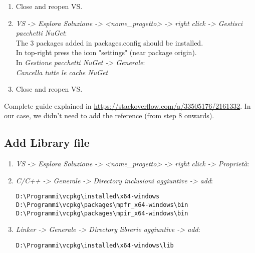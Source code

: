 \documentclass[11pt, english, openany]{report}
\begin{document}
\begin{appendices}
\begin{enumerate}
\begin{lstlisting}
.\..\packages\NuGet.CommandLine.5.5.1\tools\NuGet.exe Install -NonInteractive -OutputDirectory packages packages.config
\end{lstlisting}
	
\item Close and reopen VS.

\item \textit{VS -> Esplora Soluzione -> <nome\_progetto> -> right click -> Gestisci pacchetti NuGet}: \\
The 3 packages added in packages.config should be installed.\\
In top-right press the icon "settings" (near package origin). \\
In \textit{Gestione pacchetti NuGet -> Generale}: \\

	\textit{Cancella tutte le cache NuGet}

\item Close and reopen VS.
\end{enumerate}

Complete guide explained in \href{https://stackoverflow.com/a/33505176/2161332}{https://stackoverflow.com/a/33505176/2161332}. In our case, we didn't need to add the reference (from step 8 onwards).


\subsection{Add Library file}
\begin{enumerate}
\item \textit{VS -> Esplora Soluzione -> <nome\_progetto> -> right click -> Proprietà}:

\item \textit{C/C++ -> Generale -> Directory inclusioni aggiuntive -> add}:

\begin{lstlisting}
D:\Programmi\vcpkg\installed\x64-windows
D:\Programmi\vcpkg\packages\mpfr_x64-windows\bin
D:\Programmi\vcpkg\packages\mpir_x64-windows\bin
\end{lstlisting}
	
\item \textit{Linker -> Generale -> Directory librerie aggiuntive -> add}:

\begin{lstlisting}
D:\Programmi\vcpkg\installed\x64-windows\lib
\end{lstlisting}


\end{enumerate}
\end{appendices}
\end{document}
